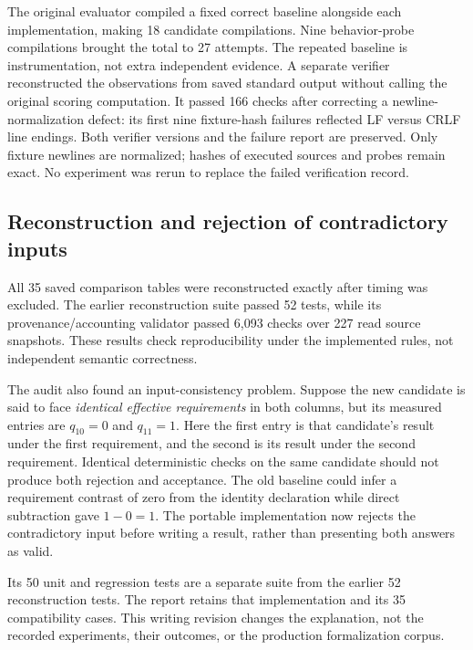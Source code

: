 The original evaluator compiled a fixed correct baseline alongside each implementation, making 18 candidate compilations. Nine behavior-probe compilations brought the total to 27 attempts. The repeated baseline is instrumentation, not extra independent evidence. A separate verifier reconstructed the observations from saved standard output without calling the original scoring computation. It passed 166 checks after correcting a newline-normalization defect: its first nine fixture-hash failures reflected LF versus CRLF line endings. Both verifier versions and the failure report are preserved. Only fixture newlines are normalized; hashes of executed sources and probes remain exact. No experiment was rerun to replace the failed verification record.

\subsection{Reconstruction and rejection of contradictory inputs}
\label{subsec:reconstruction}
All 35 saved comparison tables were reconstructed exactly after timing was excluded. The earlier reconstruction suite passed 52 tests, while its provenance/accounting validator passed 6,093 checks over 227 read source snapshots. These results check reproducibility under the implemented rules, not independent semantic correctness.

The audit also found an input-consistency problem. Suppose the new candidate is said to face \emph{identical effective requirements} in both columns, but its measured entries are $q_{10}=0$ and $q_{11}=1$. Here the first entry is that candidate's result under the first requirement, and the second is its result under the second requirement. Identical deterministic checks on the same candidate should not produce both rejection and acceptance. The old baseline could infer a requirement contrast of zero from the identity declaration while direct subtraction gave $1-0=1$. The portable implementation now rejects the contradictory input before writing a result, rather than presenting both answers as valid.

Its 50 unit and regression tests are a separate suite from the earlier 52 reconstruction tests. The report retains that implementation and its 35 compatibility cases. This writing revision changes the explanation, not the recorded experiments, their outcomes, or the production formalization corpus.

